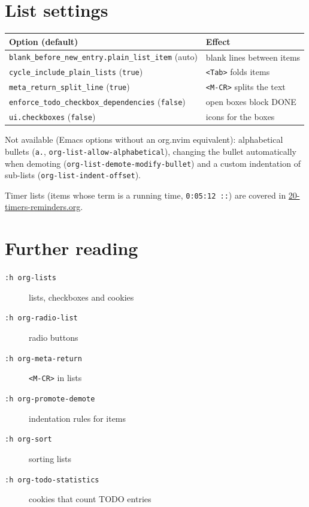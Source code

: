 \section{List settings}
\label{sec:org6d2fcfd}
\begin{center}
\begin{tabular}{ll}
Option (default) & Effect\\
\hline
\texttt{blank\_before\_new\_entry.plain\_list\_item} (auto) & blank lines between items\\
\texttt{cycle\_include\_plain\_lists} (\texttt{true}) & \texttt{<Tab>} folds items\\
\texttt{meta\_return\_split\_line} (\texttt{true}) & \texttt{<M-CR>} splits the text\\
\texttt{enforce\_todo\_checkbox\_dependencies} (\texttt{false}) & open boxes block DONE\\
\texttt{ui.checkboxes} (\texttt{false}) & icons for the boxes\\
\end{tabular}
\end{center}

Not available (Emacs options without an org.nvim equivalent): alphabetical
bullets (\texttt{a.}, \texttt{org-list-allow-alphabetical}), changing the bullet
automatically when demoting (\texttt{org-list-demote-modify-bullet}) and a custom
indentation of sub-lists (\texttt{org-list-indent-offset}).

Timer lists (items whose term is a running time, \texttt{0:05:12 ::}) are covered
in \href{20-timers-reminders.org}{20-timers-reminders.org}.
\section{Further reading}
\label{sec:orgd5b1c41}
\begin{description}
\item[{\texttt{:h org-lists}}] lists, checkboxes and cookies
\item[{\texttt{:h org-radio-list}}] radio buttons
\item[{\texttt{:h org-meta-return}}] \texttt{<M-CR>} in lists
\item[{\texttt{:h org-promote-demote}}] indentation rules for items
\item[{\texttt{:h org-sort}}] sorting lists
\item[{\texttt{:h org-todo-statistics}}] cookies that count TODO entries
\end{description}
